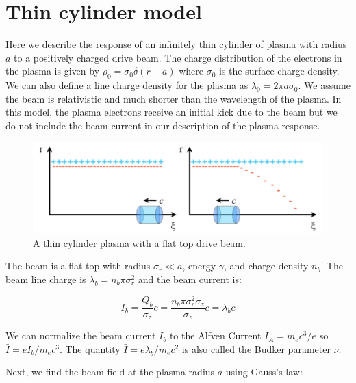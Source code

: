 \documentclass[aps,prl,preprint,groupedaddress]{revtex4-1}
\begin{document}
\section{Thin cylinder model}

Here we describe the response of an infinitely thin cylinder of plasma with radius $a$ to a positively charged drive beam. The charge distribution of the electrons in the plasma is given by $\rho_0 = \sigma_0 \delta(r-a)$ where $\sigma_0$ is the surface charge density. We can also define a line charge density for the plasma as $\lambda_0 = 2\pi a \sigma_0$. We assume the beam is relativistic and much shorter than the wavelength of the plasma. In this model, the plasma electrons receive an initial kick due to the beam but we do not include the beam current in our description of the plasma response. 


\begin{figure}[ht]\label{fig:thin_cyl}
  \centering
    \includegraphics[width=150mm]{./figures/thin_cyl.pdf}
      \caption{A thin cylinder plasma with a flat top drive beam.}
\end{figure}

The beam is a flat top with radius $\sigma_r \ll a$, energy $\gamma$, and charge density $n_b$. The beam line charge is $\lambda_b = n_b \pi \sigma_r^2$ and the beam current is:

\begin{equation}\label{eq:I_beam}
I_b = \frac{Q_b}{\sigma_z}c = \frac{n_b \pi \sigma_r^2 \sigma_z}{\sigma_z}c = \lambda_b c
\end{equation}

We can normalize the beam current $I_b$ to the Alfven Current $I_A = m_e c^3/e$ so $\bar{I} = e I_b /m_e c^3$. The quantity $\bar{I} = e \lambda_b/m_e c^2$ is also called the Budker parameter $\nu$. 

Next, we find the beam field at the plasma radius $a$ using Gauss's law:
\end{document}
